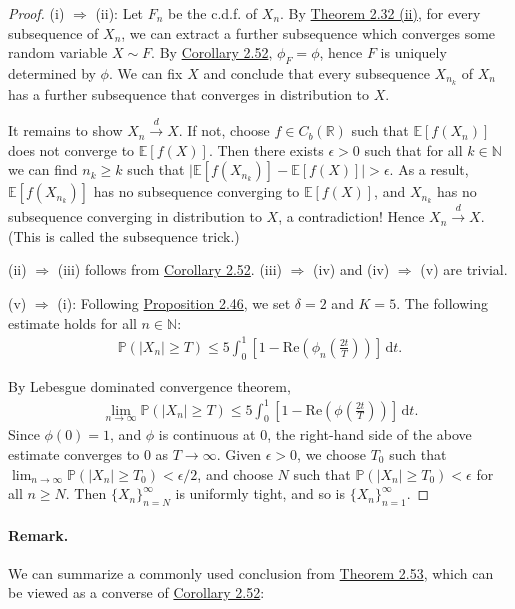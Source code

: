 \documentclass{article}
\numberwithin{equation}{section}
\newcommand{\E}{\mathbb{E}}
\renewcommand{\P}{\mathbb{P}}
\renewcommand{\d}{\mathrm{d}}
\renewcommand{\Re}{\mathrm{Re}}
\theoremstyle{plain}
\theoremstyle{definition}
\begin{document}
\begin{proof}
(i) $\Rightarrow$ (ii): Let $F_n$ be the c.d.f. of $X_n$. By \hyperref[thm:2.32]{Theorem 2.32 (ii)}, for every subsequence of $X_n$, we can extract a further subsequence which converges some random variable $X\sim F$. By \hyperref[cor:2.52]{Corollary 2.52}, $\phi_F=\phi$, hence $F$ is uniquely determined by $\phi$. We can fix $X$ and conclude that every subsequence $X_{n_k}$ of $X_n$ has a further subsequence that converges in distribution to $X$.

It remains to show $X_n\overset{d}{\to}X$. If not, choose $f\in C_b(\mathbb{R})$ such that $\E[f(X_n)]$ does not converge to $\E[f(X)]$. Then there exists $\epsilon>0$ such that for all $k\in\mathbb{N}$ we can find $n_k\geq k$ such that $\vert\E[f(X_{n_k})]-\E[f(X)]\vert>\epsilon$. As a result, $\E[f(X_{n_k})]$ has no subsequence converging to $\E[f(X)]$, and $X_{n_k}$ has no subsequence converging in distribution to $X$, a contradiction! Hence $X_n\overset{d}{\to} X$. (This is called the subsequence trick.)

(ii) $\Rightarrow$ (iii) follows from \hyperref[cor:2.52]{Corollary 2.52}. (iii) $\Rightarrow$ (iv) and (iv) $\Rightarrow$ (v) are trivial.

(v) $\Rightarrow$ (i): Following \hyperref[prop:2.46]{Proposition 2.46}, we set $\delta=2$ and $K=5$. The following estimate holds for all $n\in\mathbb{N}$:
\begin{align*}
	\P(\vert X_n\vert\geq T)\leq 5\int_0^1\left[1-\Re\left(\phi_{n}\left(\frac{2t}{T}\right)\right)\right]\,\d t.
\end{align*}

By Lebesgue dominated convergence theorem,
\begin{align*}
	\lim_{n\to\infty}\P(\vert X_n\vert\geq T)\leq 5\int_0^1\left[1-\Re\left(\phi\left(\frac{2t}{T}\right)\right)\right]\,\d t.
\end{align*}
Since $\phi(0)=1$, and $\phi$ is continuous at $0$, the right-hand side of the above estimate converges to $0$ as $T\to\infty$. Given $\epsilon>0$, we choose $T_0$ such that $\lim_{n\to\infty}\P(\vert X_n\vert\geq T_0)<\epsilon/2$, and choose $N$ such that $\P(\vert X_n\vert\geq T_0)<\epsilon$ for all $n\geq N$. Then $\{X_n\}_{n=N}^\infty$ is uniformly tight, and so is $\{X_n\}_{n=1}^\infty$.
\end{proof}

\paragraph{Remark.} We can summarize a commonly used conclusion from \hyperref[thm:2.53]{Theorem 2.53}, which can be viewed as a converse of \hyperref[cor:2.52]{Corollary 2.52}: 
\end{document}
